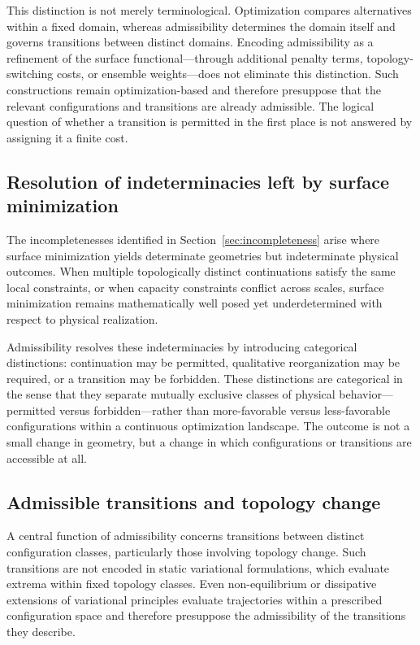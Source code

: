 This distinction is not merely terminological. Optimization compares alternatives within a fixed domain, whereas admissibility determines the domain itself and governs transitions between distinct domains. Encoding admissibility as a refinement of the surface functional---through additional penalty terms, topology-switching costs, or ensemble weights---does not eliminate this distinction. Such constructions remain optimization-based and therefore presuppose that the relevant configurations and transitions are already admissible. The logical question of whether a transition is permitted in the first place is not answered by assigning it a finite cost.

\subsection{Resolution of indeterminacies left by surface minimization}

The incompletenesses identified in Section~\ref{sec:incompleteness} arise where surface minimization yields determinate geometries but indeterminate physical outcomes. When multiple topologically distinct continuations satisfy the same local constraints, or when capacity constraints conflict across scales, surface minimization remains mathematically well posed yet underdetermined with respect to physical realization.

Admissibility resolves these indeterminacies by introducing categorical distinctions: continuation may be permitted, qualitative reorganization may be required, or a transition may be forbidden. These distinctions are categorical in the sense that they separate mutually exclusive classes of physical behavior---permitted versus forbidden---rather than more-favorable versus less-favorable configurations within a continuous optimization landscape. The outcome is not a small change in geometry, but a change in which configurations or transitions are accessible at all.

\subsection{Admissible transitions and topology change}

A central function of admissibility concerns transitions between distinct configuration classes, particularly those involving topology change. Such transitions are not encoded in static variational formulations, which evaluate extrema within fixed topology classes. Even non-equilibrium or dissipative extensions of variational principles evaluate trajectories within a prescribed configuration space and therefore presuppose the admissibility of the transitions they describe.

